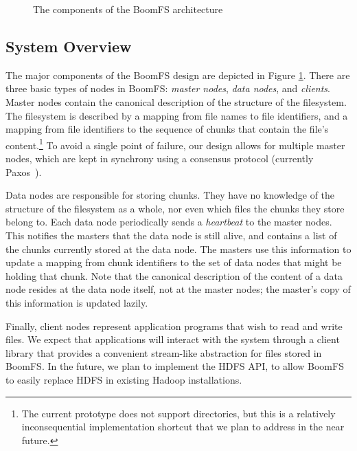 \documentclass{article}
\begin{document}
\begin{figure}
\centering
{}
\caption{The components of the BoomFS architecture}
\label{fig:system-arch}
\end{figure}

\subsection{System Overview}
The major components of the BoomFS design are depicted in Figure
\ref{fig:system-arch}. There are three basic types of nodes in BoomFS:
\emph{master nodes}, \emph{data nodes}, and \emph{clients}. Master
nodes contain the canonical description of the structure of the
filesystem. The filesystem is described by a mapping from file names
to file identifiers, and a mapping from file identifiers to the
sequence of chunks that contain the file's content.\footnote{The
  current prototype does not support directories, but this is a
  relatively inconsequential implementation shortcut that we plan to
  address in the near future.} To avoid a single point of failure, our
design allows for multiple master nodes, which are kept in synchrony
using a consensus protocol (currently Paxos~\cite{paxos-made-simple}).

Data nodes are responsible for storing chunks. They have no knowledge
of the structure of the filesystem as a whole, nor even which files
the chunks they store belong to. Each data node periodically sends a
\emph{heartbeat} to the master nodes. This notifies the masters that
the data node is still alive, and contains a list of the chunks
currently stored at the data node. The masters use this information to
update a mapping from chunk identifiers to the set of data nodes that
might be holding that chunk. Note that the canonical description of
the content of a data node resides at the data node itself, not at the
master nodes; the master's copy of this information is updated lazily.

Finally, client nodes represent application programs that wish to read
and write files. We expect that applications will interact with the
system through a client library that provides a convenient stream-like
abstraction for files stored in BoomFS. In the future, we plan to
implement the HDFS API, to allow BoomFS to easily replace HDFS in
existing Hadoop installations. %
\end{document}
